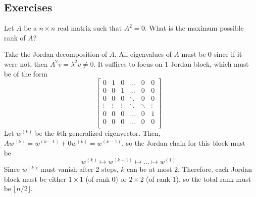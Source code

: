 \subsection{Exercises} 

	\begin{exercise}
	  Let $A$ be a $n \times n$ real matrix such that $A^2 = 0$. What is the maximum possible rank of $A$? 
	\end{exercise}
	\begin{solution}
	  Take the Jordan decomposition of $A$. All eigenvalues of $A$ must be $0$ since if it were not, then $A^2 v = \lambda^2 v \neq 0$. It suffices to focus on 1 Jordan block, which must be of the form 
		\begin{equation}
			\begin{bmatrix} 
				0 & 1 & 0 & \ldots & 0 & 0 \\ 
				0 & 0 & 1 & \ldots & 0 & 0 \\ 
				0 & 0 & 0 & \ddots & 0 & 0 \\ 
				\vdots & \vdots & \vdots & \ddots & \ddots & \vdots \\ 
				0 & 0 & 0 & \ldots & 0 & 1 \\ 
				0 & 0 & 0 & \ldots & 0 & 0 \\ 
			\end{bmatrix}
		\end{equation}
		Let $w^{(k)}$ be the $k$th generalized eigenvector. Then, $A w^{(k)} = w^{(k-1)} + 0 w^{(k)} = w^{(k-1)}$, so the Jordan chain for this block must be 
		\begin{equation}
			w^{(k)} \mapsto w^{(k-1)} \mapsto \ldots \mapsto w^{(1)} 
		\end{equation}
		Since $w^{(k)}$ must vanish after 2 steps, $k$ can be at most $2$. Therefore, each Jordan block must be either $1 \times 1$ (of rank 0) or $2 \times 2$ (of rank 1), so the total rank must be $\lfloor n/2 \rfloor$. 
	\end{solution}

